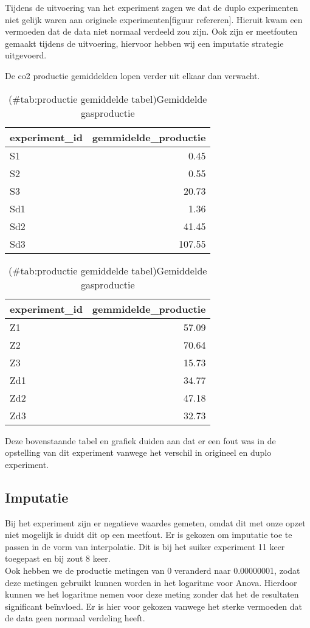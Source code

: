 \documentclass[
]{article}
\begin{document}
Tijdens de uitvoering van het experiment zagen we dat de duplo experimenten niet gelijk waren aan originele experimenten{[}figuur refereren{]}. Hieruit kwam een vermoeden dat de data niet normaal verdeeld zou zijn. Ook zijn er meetfouten gemaakt tijdens de uitvoering, hiervoor hebben wij een imputatie strategie uitgevoerd.

De co2 productie gemiddelden lopen verder uit elkaar dan verwacht.

\begin{table}
\caption{(\#tab:productie gemiddelde tabel)Gemiddelde gasproductie}

\centering
\begin{tabular}[t]{l|r}
\hline
experiment\_id & gemmidelde\_productie\\
\hline
S1 & 0.45\\
\hline
S2 & 0.55\\
\hline
S3 & 20.73\\
\hline
Sd1 & 1.36\\
\hline
Sd2 & 41.45\\
\hline
Sd3 & 107.55\\
\hline
\end{tabular}
\centering
\begin{tabular}[t]{l|r}
\hline
experiment\_id & gemmidelde\_productie\\
\hline
Z1 & 57.09\\
\hline
Z2 & 70.64\\
\hline
Z3 & 15.73\\
\hline
Zd1 & 34.77\\
\hline
Zd2 & 47.18\\
\hline
Zd3 & 32.73\\
\hline
\end{tabular}
\end{table}

Deze bovenstaande tabel en grafiek duiden aan dat er een fout was in de opstelling van dit experiment vanwege het verschil in origineel en duplo experiment.

\subsection{Imputatie}\label{imputatie}

Bij het experiment zijn er negatieve waardes gemeten, omdat dit met onze opzet niet mogelijk is duidt dit op een meetfout. Er is gekozen om imputatie toe te passen in de vorm van interpolatie. Dit is bij het suiker experiment 11 keer toegepast en bij zout 8 keer.\\
Ook hebben we de productie metingen van 0 veranderd naar 0.00000001, zodat deze metingen gebruikt kunnen worden in het logaritme voor Anova. Hierdoor kunnen we het logaritme nemen voor deze meting zonder dat het de resultaten significant beïnvloed. Er is hier voor gekozen vanwege het sterke vermoeden dat de data geen normaal verdeling heeft.
\end{document}
